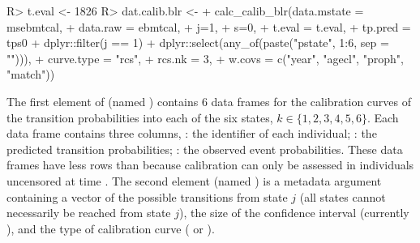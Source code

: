 \documentclass[nojss]{jss}
\begin{document}
\begin{Schunk}
\begin{Sinput}
R> t.eval <- 1826
R> dat.calib.blr <-
+    calc_calib_blr(data.mstate = msebmtcal,
+                   data.raw = ebmtcal,
+                   j=1,
+                   s=0,
+                   t.eval = t.eval,
+                   tp.pred = tps0 %
+                    dplyr::filter(j == 1) %
+                    dplyr::select(any_of(paste("pstate", 1:6, sep = ""))),
+                   curve.type = "rcs",
+                   rcs.nk = 3,
+                   w.covs = c("year", "agecl", "proph", "match"))
\end{Sinput}
\end{Schunk}

The first element of  (named ) contains 6 data frames for the calibration curves of the transition probabilities into each of the six states, $k \in \{1,2,3,4,5,6\}$. Each data frame contains three columns, : the identifier of each individual; : the predicted transition probabilities; : the observed event probabilities. These data frames have less rows than  because calibration can only be assessed in individuals uncensored at time . The second element (named ) is a metadata argument containing a vector of the possible transitions from state $j$ (all states cannot necessarily be reached from state $j$), the size of the confidence interval (currently ), and the type of calibration curve ( or ).
\end{document}
